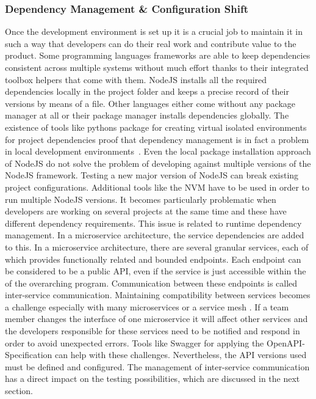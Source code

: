 \documentclass[12pt, a4paper]{article}
\begin{document}
        \subsubsection{Dependency Management \& Configuration Shift}
        Once the development environment is set up it is a crucial job to maintain it in such a way that developers can do their real work and contribute value to the product. Some programming languages frameworks are able to keep dependencies consistent across multiple systems without much effort thanks to their integrated toolbox helpers that come with them. NodeJS installs all the required dependencies locally in the project folder and keeps a precise record of their versions by means of a  file. Other languages either come without any package manager at all or their package manager installs dependencies globally. The existence of tools like pythons  package for creating virtual isolated environments for project dependencies proof that dependency management is in fact a problem in local development environments~\cite{pythonvenv}. Even the local package installation approach of NodeJS do not solve the problem of developing against multiple versions of the NodeJS framework. Testing a new major version of NodeJS can break existing project configurations. Additional tools like the \ac{NVM} have to be used in order to run multiple NodeJS versions. It becomes particularly problematic when developers are working on several projects at the same time and these have different dependency requirements. This issue is related to runtime dependency management. In a microservice architecture, the service dependencies are added to this.\newline
        In a microservice architecture, there are several granular services, each of which provides functionally related and bounded endpoints. Each endpoint can be considered to be a public \ac{API}, even if the service is just accessible within the of the overarching program. Communication between these endpoints is called inter-service communication. Maintaining compatibility between services becomes a challenge especially with many microservices or a service mesh \cite{micro}. If a team member changes the interface of one microservice it will affect other services and the developers responsible for these services need to be notified and respond in order to avoid unexpected errors. Tools like Swagger for applying the OpenAPI-Specification can help with these challenges. Nevertheless, the API versions used must be defined and configured. The management of inter-service communication has a direct impact on the testing possibilities, which are discussed in the next section.\newline
\end{document}
